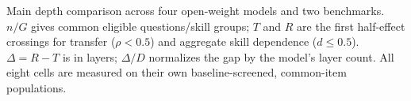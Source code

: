 \begin{table}[t]
\centering
\caption{Main depth comparison across four open-weight models and two benchmarks.
$n/G$ gives common eligible questions/skill groups; $T$ and $R$ are the first
half-effect crossings for transfer ($\rho<0.5$) and aggregate skill dependence
($d\le0.5$). $\Delta=R-T$ is in layers; $\Delta/D$ normalizes the gap
by the model's layer count. All eight cells are measured on their own
baseline-screened, common-item populations.}
\label{tab:paireddepth}
\normalfont\rmfamily\fontsize{9}{11}\selectfont
\renewcommand{\arraystretch}{1.18}
\setlength{\tabcolsep}{3pt}

\end{table}

